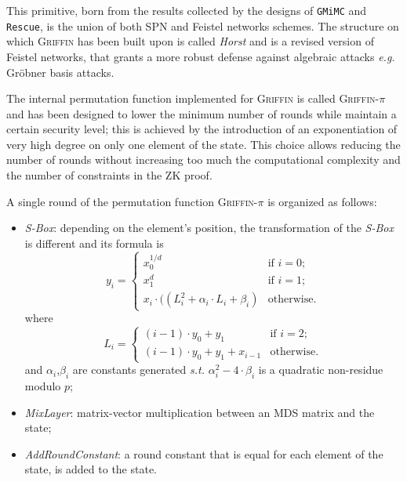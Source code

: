 \documentclass[12pt, a4paper]{report}
\begin{document}
This primitive, born from the results collected by the designs of \texttt{GMiMC} and \texttt{Rescue}, is the union of both SPN and Feistel networks schemes.
The structure on which \textsc{Griffin} has been built upon is called \textit{Horst} and is a revised version of Feistel networks, that grants a more robust defense against algebraic attacks \textsl{e.g.} Gr\"obner basis attacks.

The internal permutation function implemented for \textsc{Griffin} is called \textsc{Griffin-$\pi$} and has been designed to lower the minimum number of rounds while maintain a certain security level; this is achieved by the introduction of an exponentiation of very high degree on only one element of the state. This choice allows reducing the number of rounds without increasing too much the computational complexity and the number of constraints in the ZK proof.

A single round of the permutation function \textsc{Griffin-$\pi$} is organized as follows:
\begin{itemize}
  \item \textit{S-Box}: depending on the element's position, the transformation of the \textit{S-Box} is different and its formula is
  \begin{equation}
    y_i = \left\{
      \begin{array}{ll}
        x_0^{1/d} & \text{if } i = 0; \\
        x_1^{d} & \text{if } i = 1; \\
        x_i \cdot ((L_i^2 + \alpha_i \cdot L_i + \beta_i) & \text{otherwise}.
      \end{array}
    \right.
    \label{eq:griffinsbox}
  \end{equation}
  where
  \begin{equation}
    L_i = \left\{
      \begin{array}{ll}
        (i-1) \cdot y_0 + y_1 & \text{if } i = 2; \\
        (i-1) \cdot y_0 + y_1 + x_{i-1} & \text{otherwise}.
      \end{array}
    \right.
    \label{eq:griffinli}
  \end{equation}
  and $\alpha_i$,$\beta_i$ are constants generated \textsl{s.t.} $\alpha_i^2 - 4 \cdot \beta_i$ is a quadratic non-residue modulo $p$;
  \item \textit{MixLayer}: matrix-vector multiplication between an MDS matrix and the state;
  \item \textit{AddRoundConstant}: a round constant that is equal for each element of the state, is added to the state.
\end{itemize}
\end{document}
